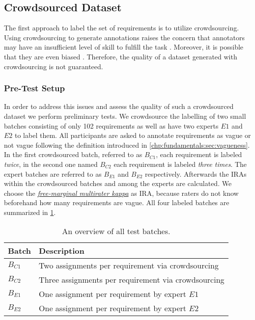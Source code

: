\subsection{Crowdsourced Dataset}
\label{chp:study:sec:study_objects:crowdsourced_dataset}

The first approach to label the set of requirements is to utilize crowdsourcing.
Using crowdsourcing to generate annotations raises the concern that annotators may have an insufficient level of skill to fulfill the task \parencite{Quinn:2011}.
Moreover, it is possible that they are even biased \parencite{Kittur:2008}.
Therefore, the quality of a dataset generated with crowdsourcing is not guaranteed.

\subsubsection{Pre-Test Setup}
In order to address this issues and assess the quality of such a crowdsourced dataset we perform preliminary tests.
We crowdsource the labelling of two small batches consisting of only 102 requirements as well as have two experts $E1$ and $E2$ to label them.
All participants are asked to annotate requirements as vague or not vague following the definition introduced in \cref{chp:fundamentals:sec:vagueness}.
In the first crowdsourced batch, referred to as $B_{C1}$, each requirement is labeled \textit{twice}, in the second one named $B_{C2}$ each requirement is labeled \textit{three times}.
The expert batches are referred to as $B_{E1}$ and $B_{E2}$ respectively.
Afterwards the \acp{IRA} within the crowdsourced batches and among the experts are calculated.
We choose the \hyperref[chp:fundamentals:sec:inter_rater_agreement:subsec:free_marginal_multirater_kappa]{\textit{free-marginal multirater kappa}} as \ac{IRA}, because raters do not know beforehand how many requirements are vague.
All four labeled batches are summarized in \cref{tab:study:objects:crowdsourcing:batches}.
\begin{table}[htpb]
    \centering
    \begin{tabular}{l l}
        \toprule
        Batch & Description \\
        \midrule
        $B_{C1}$ & Two assignments per requirement via crowdsourcing\\
        $B_{C2}$ & Three assignments per requirement via crowdsourcing\\
        $B_{E1}$ & One assignment per requirement by expert $E1$ \\
        $B_{E2}$ & One assignment per requirement by expert $E2$ \\
        \bottomrule
    \end{tabular}
    \caption[Overview of test batches]{An overview of all test batches.}\label{tab:study:objects:crowdsourcing:batches}
\end{table}

